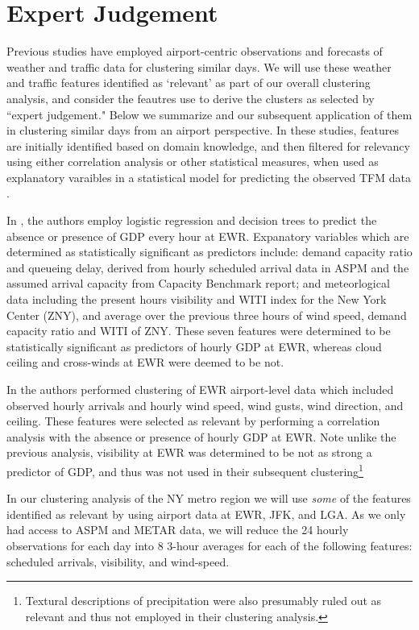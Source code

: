 \documentclass[11pt]{amsart}
\begin{document}
\section{Expert Judgement}
Previous studies have employed airport-centric observations and forecasts of weather and traffic data for clustering similar days.  We will use these weather and traffic features identified as `relevant' as part of our overall clustering analysis, and consider the feautres use to derive the clusters as selected by ``expert judgement."  Below we summarize  and our subsequent application of them in clustering similar days from an airport perspective.  In these studies, features are initially identified based on domain knowledge, and then filtered for relevancy using either correlation analysis or other statistical measures, when used as explanatory varaibles in a statistical model for predicting the observed TFM data \cite{mukherjeepredicting,grabbe2013similar}.  

In \cite{mukherjeepredicting}, the authors employ logistic regression and decision trees to predict the absence or presence of GDP every hour at EWR.  Expanatory variables which are determined as statistically significant as predictors include: demand capacity ratio and queueing delay, derived from hourly scheduled arrival data in ASPM and the assumed arrival capacity from Capacity Benchmark report; and meteorlogical data including the present hours visibility and WITI index for the New York Center (ZNY), and average over the previous three hours of wind speed, demand capacity ratio and WITI of ZNY.  These seven features were determined to be statistically significant as predictors of hourly GDP at EWR, whereas cloud ceiling and cross-winds at EWR were deemed to be not.  

In \cite{grabbe2013similar} the authors performed clustering of EWR airport-level data which included observed hourly arrivals and hourly wind speed, wind gusts, wind direction, and ceiling.  These features were selected as relevant by performing a correlation analysis with the absence or presence of hourly GDP at EWR.  Note unlike the previous analysis, visibility at EWR was determined to be not as strong a predictor of GDP, and thus was not used in their subsequent clustering\footnote{Textural descriptions of precipitation were also presumably ruled out as relevant and thus not employed in their clustering analysis.}

In our clustering analysis of the NY metro region we will use \emph{some} of the features identified as relevant by \cite{mukherjeepredicting} using airport data at EWR, JFK, and LGA. As we only had access to ASPM and METAR data, we will reduce the 24 hourly observations for each day into 8 3-hour averages for each of the following features: scheduled arrivals, visibility, and wind-speed.  
\end{document}
